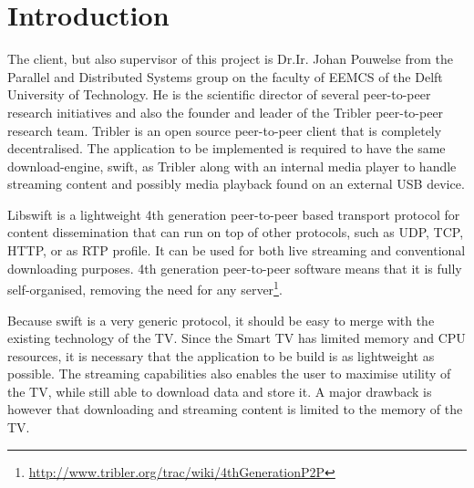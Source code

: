 \chapter{Introduction}
The client, but also supervisor of this project is Dr.Ir. Johan Pouwelse from the Parallel and Distributed Systems group on the faculty of EEMCS of the Delft University of Technology.
He is the scientific director of several peer-to-peer research initiatives and also the founder and leader of the Tribler peer-to-peer research team.
Tribler\cite{tribler} is an open source peer-to-peer client that is completely decentralised.
The application to be implemented is required to have the same download-engine, swift,\cite{swift} as Tribler
along with an internal media player to handle streaming content and possibly media playback found on an external USB device.

Libswift is a lightweight 4th generation peer-to-peer based transport protocol for content dissemination
that can run on top of other protocols, such as UDP, TCP, HTTP, or as RTP profile.
It can be used for both live streaming and conventional downloading purposes.
4th generation peer-to-peer software means that it is fully self-organised, removing the need for any server\footnote{\url{http://www.tribler.org/trac/wiki/4thGenerationP2P}}.

Because swift is a very generic protocol, it should be easy to merge with the existing technology of the TV.
Since the Smart TV has limited memory and CPU resources, 
it is necessary that the application to be build is as lightweight as possible.
The streaming capabilities also enables the user to maximise utility of the TV,
while still able to download data and store it.
A major drawback is however that downloading and streaming content is limited to the memory of the TV.
